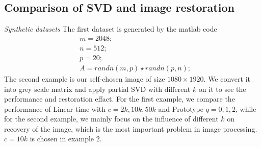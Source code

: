 \documentclass{article}
\begin{document}
\subsection{Comparison of SVD and image restoration}
\emph{Synthetic datasets} The first dataset is generated by the matlab code 
$$
\begin{aligned}
&m=2048 ; \\
&n=512 ; \\
&p=20 ; \\
&A=r a n d n(m, p) \star r a n d n(p, n) ;
\end{aligned}
$$
The second example is our self-chosen image of size $1080\times 1920$. We convert it into grey scale matrix and apply partial SVD with different $k$ on it to see the performance and restoration effact. For the first example, we compare the performance of Linear time with $c=2k,10k,50k$ and Prototype $q=0,1,2$, while for the second example, we mainly focus on the influence of different $k$ on recovery of the image, which is the most important problem in image processing. $c=10k$ is chosen in example 2.
\end{document}
